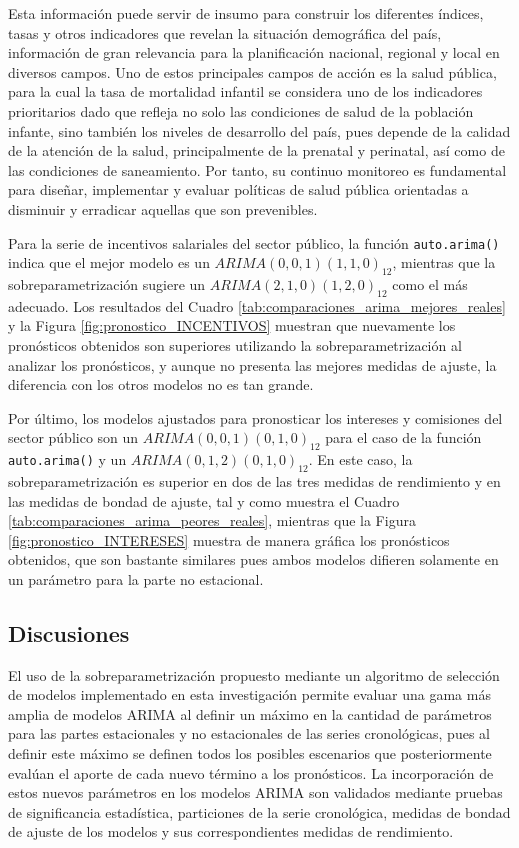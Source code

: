 \documentclass[
]{article}
\begin{document}
Esta información puede servir de insumo para construir los diferentes
índices, tasas y otros indicadores que revelan la situación demográfica
del país, información de gran relevancia para la planificación nacional,
regional y local en diversos campos. Uno de estos principales campos de
acción es la salud pública, para la cual la tasa de mortalidad infantil
se considera uno de los indicadores prioritarios dado que refleja no
solo las condiciones de salud de la población infante, sino también los
niveles de desarrollo del país, pues depende de la calidad de la
atención de la salud, principalmente de la prenatal y perinatal, así
como de las condiciones de saneamiento. Por tanto, su continuo monitoreo
es fundamental para diseñar, implementar y evaluar políticas de salud
pública orientadas a disminuir y erradicar aquellas que son prevenibles.

Para la serie de incentivos salariales del sector público, la función
\texttt{auto.arima()} indica que el mejor modelo es un
\(ARIMA(0,0,1)(1,1,0)_{12}\), mientras que la sobreparametrización
sugiere un \(ARIMA(2,1,0)(1,2,0)_{12}\) como el más adecuado. Los
resultados del Cuadro \ref{tab:comparaciones_arima_mejores_reales} y la
Figura \ref{fig:pronostico_INCENTIVOS} muestran que nuevamente los
pronósticos obtenidos son superiores utilizando la sobreparametrización
al analizar los pronósticos, y aunque no presenta las mejores medidas de
ajuste, la diferencia con los otros modelos no es tan grande.

Por último, los modelos ajustados para pronosticar los intereses y
comisiones del sector público son un \(ARIMA(0,0,1)(0,1,0)_{12}\) para
el caso de la función \texttt{auto.arima()} y un
\(ARIMA(0,1,2)(0,1,0)_{12}\). En este caso, la sobreparametrización es
superior en dos de las tres medidas de rendimiento y en las medidas de
bondad de ajuste, tal y como muestra el Cuadro
\ref{tab:comparaciones_arima_peores_reales}, mientras que la Figura
\ref{fig:pronostico_INTERESES} muestra de manera gráfica los pronósticos
obtenidos, que son bastante similares pues ambos modelos difieren
solamente en un parámetro para la parte no estacional.

\subsection{Discusiones}

El uso de la sobreparametrización propuesto mediante un algoritmo de
selección de modelos implementado en esta investigación permite evaluar
una gama más amplia de modelos ARIMA al definir un máximo en la cantidad
de parámetros para las partes estacionales y no estacionales de las
series cronológicas, pues al definir este máximo se definen todos los
posibles escenarios que posteriormente evalúan el aporte de cada nuevo
término a los pronósticos. La incorporación de estos nuevos parámetros
en los modelos ARIMA son validados mediante pruebas de significancia
estadística, particiones de la serie cronológica, medidas de bondad de
ajuste de los modelos y sus correspondientes medidas de rendimiento.
\end{document}
